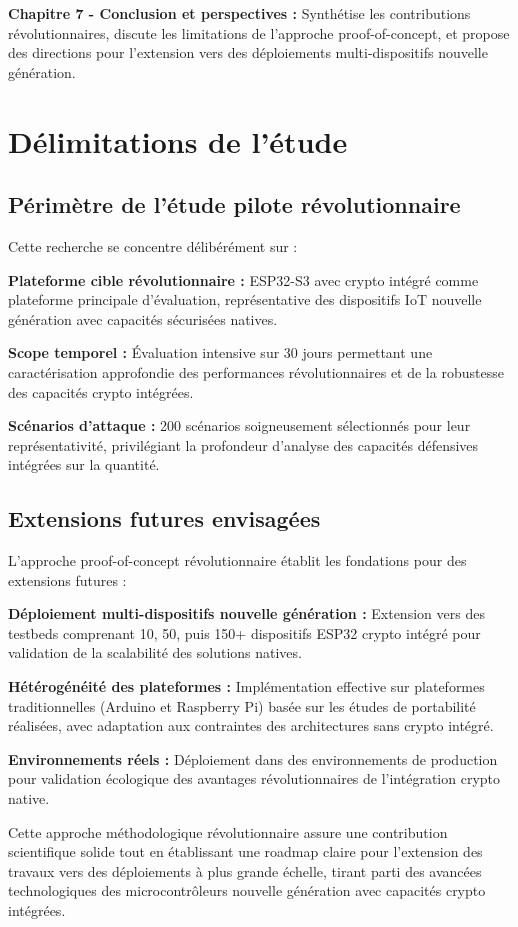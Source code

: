 \textbf{Chapitre 7 - Conclusion et perspectives :} Synthétise les contributions révolutionnaires, discute les limitations de l'approche proof-of-concept, et propose des directions pour l'extension vers des déploiements multi-dispositifs nouvelle génération.

\section{Délimitations de l'étude}

\subsection{Périmètre de l'étude pilote révolutionnaire}

Cette recherche se concentre délibérément sur :

\textbf{Plateforme cible révolutionnaire :} ESP32-S3 avec crypto intégré comme plateforme principale d'évaluation, représentative des dispositifs IoT nouvelle génération avec capacités sécurisées natives.

\textbf{Scope temporel :} Évaluation intensive sur 30 jours permettant une caractérisation approfondie des performances révolutionnaires et de la robustesse des capacités crypto intégrées.

\textbf{Scénarios d'attaque :} 200 scénarios soigneusement sélectionnés pour leur représentativité, privilégiant la profondeur d'analyse des capacités défensives intégrées sur la quantité.

\subsection{Extensions futures envisagées}

L'approche proof-of-concept révolutionnaire établit les fondations pour des extensions futures :

\textbf{Déploiement multi-dispositifs nouvelle génération :} Extension vers des testbeds comprenant 10, 50, puis 150+ dispositifs ESP32 crypto intégré pour validation de la scalabilité des solutions natives.

\textbf{Hétérogénéité des plateformes :} Implémentation effective sur plateformes traditionnelles (Arduino et Raspberry Pi) basée sur les études de portabilité réalisées, avec adaptation aux contraintes des architectures sans crypto intégré.

\textbf{Environnements réels :} Déploiement dans des environnements de production pour validation écologique des avantages révolutionnaires de l'intégration crypto native.

Cette approche méthodologique révolutionnaire assure une contribution scientifique solide tout en établissant une roadmap claire pour l'extension des travaux vers des déploiements à plus grande échelle, tirant parti des avancées technologiques des microcontrôleurs nouvelle génération avec capacités crypto intégrées.